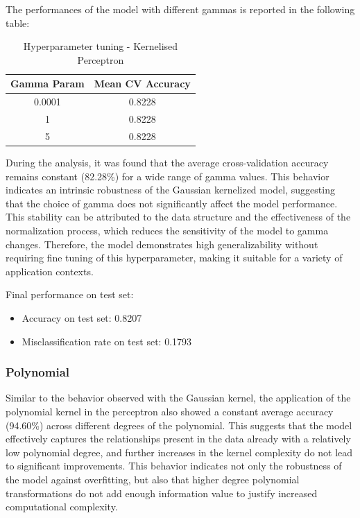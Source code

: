 \documentclass[a4paper, 10pt]{article}
\begin{document}
The performances of the model with different gammas is reported in the following table:
\begin{table}[H]
\centering
\begin{tabular}{|c|c|}
\hline
\textbf{Gamma Param} & \textbf{Mean CV Accuracy} \\ \hline
0.0001 & 0.8228\\ \hline
1 & 0.8228 \\ \hline
5 & 0.8228 \\ \hline
\end{tabular}
\caption{Hyperparameter tuning - Kernelised Perceptron}
\label{tab:CVaccuracyKPG}
\end{table}

During the analysis, it was found that the average cross-validation accuracy remains constant (82.28\%) for a wide range of gamma values. This behavior indicates an intrinsic robustness of the Gaussian kernelized model, suggesting that the choice of gamma does not significantly affect the model performance. This stability can be attributed to the data structure and the effectiveness of the normalization process, which reduces the sensitivity of the model to gamma changes. Therefore, the model demonstrates high generalizability without requiring fine tuning of this hyperparameter, making it suitable for a variety of application contexts.

Final performance on test set:
\begin{itemize}
    \item Accuracy on test set: 0.8207
    \item Misclassification rate on test set: 0.1793
\end{itemize}

\subsubsection{Polynomial}

Similar to the behavior observed with the Gaussian kernel, the application of the polynomial kernel in the perceptron also showed a constant average accuracy (94.60\%) across different degrees of the polynomial. This suggests that the model effectively captures the relationships present in the data already with a relatively low polynomial degree, and further increases in the kernel complexity do not lead to significant improvements. This behavior indicates not only the robustness of the model against overfitting, but also that higher degree polynomial transformations do not add enough information value to justify increased computational complexity.
\end{document}
